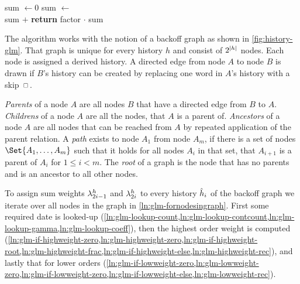 \begin{algorithm}[t]
\begin{algorithmic}[1]
      \vspace{0.7em}
      \State sum $\gets 0$
        \label{ln:lowhlp-init-sum}
        \label{ln:lowhlp-for}
          \label{ln:lowhlp-isancestor}
          \State sum $\gets$
            \label{ln:lowhlp-add-1}\\
            \hfill sum $+$ 
            \label{ln:lowhlp-add-2}
        \EndIf{}
      \EndFor
      \State \textbf{return} factor $\cdot$ sum
        \label{ln:lowhlp-return}
    \EndFunction
  \end{algorithmic}
\end{algorithm}

The algorithm works with the notion of a backoff graph as shown in
\cref{fig:history-glm}.
That graph is unique for every history $h$ and consist of $2^{\left|h\right|}$
nodes.
Each node is assigned a derived history.
A directed edge from node $A$ to node $B$ is drawn if $B$'s history can be
created by replacing one word in $A$'s history with a skip $\Skp$.

\emph{Parents} of a node $A$ are all nodes $B$ that have a directed edge from
$B$ to $A$.
\emph{Childrens} of a node $A$ are all the nodes, that $A$ is a parent of.
\emph{Ancestors} of a node $A$ are all nodes that can be reached from $A$
by repeated application of the parent relation.
A \emph{path} exists to node $A_1$ from node $A_m$, if there is a set of nodes
$\Set{A_1, \ldots, A_m}$ such that it holds for all nodes $A_i$ in that set,
that $A_{i+1}$ is a parent of $A_i$ for $1 \leq i < m$.
The \emph{root} of a graph is the node that has no parents and is an ancestor
to all other nodes.

To assign sum weights $\lambda^h_{2 i - 1}$ and $\lambda^h_{2 i}$ to
every history $\DerivedHistory[i]$ of the backoff graph we iterate over all
nodes in the graph in \cref{ln:glm-fornodesingraph}.
First some required date is looked-up
(\cref{ln:glm-lookup-count,ln:glm-lookup-contcount,ln:glm-lookup-gamma,ln:glm-lookup-coeff}),
then the highest order weight is computed
(\cref{ln:glm-if-highweight-zero,ln:glm-highweight-zero,ln:glm-if-highweight-root,ln:glm-highweight-frac,ln:glm-if-highweight-else,ln:glm-highweight-rec}),
and lastly that for lower orders
(\cref{ln:glm-if-lowweight-zero,ln:glm-lowweight-zero,ln:glm-if-lowweight-zero,ln:glm-if-lowweight-else,ln:glm-lowweight-rec}).

